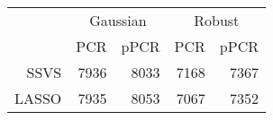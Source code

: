 \begingroup\small
\begin{tabular}{|r|rr|rr|}
  \hline
  \multicolumn{1}{|r|}{} & \multicolumn{2}{c|}{Gaussian} & \multicolumn{2}{c|}{Robust} \\
& PCR & pPCR & PCR & pPCR \\
 \hline
SSVS & 7936 & 8033 & 7168 & 7367 \\ 
  LASSO & 7935 & 8053 & 7067 & 7352 \\ 
   \hline
\end{tabular}
\endgroup
